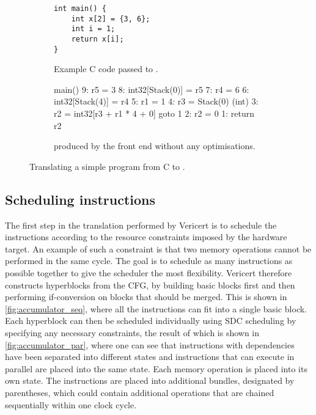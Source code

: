 \begin{figure}
  \centering
    \begin{subfigure}[b]{0.48\linewidth}
\begin{verbatim}
int main() {
    int x[2] = {3, 6};
    int i = 1;
    return x[i];
}
\end{verbatim}
      \caption{Example C code passed to \vericert{}.}\label{fig:accumulator_c}
    \end{subfigure}\hfill%
    \begin{subfigure}[b]{0.48\linewidth}
\lstset{numbers=left,basicstyle=\footnotesize\ttfamily,numberstyle=\tiny,keepspaces=true,showspaces=true,xleftmargin=20pt}
\begin{rtllisting}
main() {
    9:  r5 = 3
    8:  int32[Stack(0)] = r5
    7:  r4 = 6
    6:  int32[Stack(4)] = r4
    5:  r1 = 1
    4:  r3 = Stack(0) (int)
    3:  r2 = int32[r3 + r1 * 4 + 0]
        goto 1
    2:  r2 = 0
    1:  return r2
}
\end{rtllisting}
      \caption{\rtl{} produced by the \compcert{} front end without any optimisations.}\label{fig:accumulator_rtl}
    \end{subfigure}
    \caption{Translating a simple program from C to \rtl{}.}\label{fig:accumulator_c_rtl}
\end{figure}

\subsection{Scheduling \rtl{} instructions}

The first step in the translation performed by Vericert is to schedule the
instructions according to the resource constraints imposed by the hardware
target.  An example of such a constraint is that two memory operations cannot be
performed in the same cycle.  The goal is to schedule as many instructions as
possible together to give the scheduler the most flexibility.  Vericert
therefore constructs hyperblocks from the \rtl{} \gls{CFG}, by building basic
blocks first and then performing if-conversion on blocks that should be merged.
This is shown in \cref{fig:accumulator_seq}, where all the instructions can fit
into a single basic block.  Each hyperblock can then be scheduled individually
using \gls{SDC} scheduling by specifying any necessary constraints, the result
of which is shown in \cref{fig:accumulator_par}, where one can see that
instructions with dependencies have been separated into different states and
instructions that can execute in parallel are placed into the same state.  Each
memory operation is placed into its own state.  The instructions are placed into
additional bundles, designated by parentheses, which could contain additional
operations that are chained sequentially within one clock cycle.

